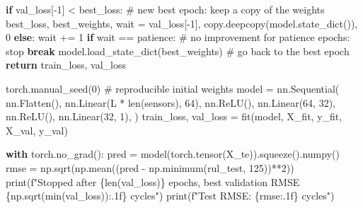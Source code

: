 \documentclass[
  letterpaper,
  DIV=11,
  numbers=noendperiod]{scrreprt}
\newenvironment{Shaded}{\begin{snugshade}}{\end{snugshade}}
\newcommand{\BuiltInTok}[1]{\textcolor[rgb]{0.00,0.23,0.31}{#1}}
\newcommand{\CommentTok}[1]{\textcolor[rgb]{0.37,0.37,0.37}{#1}}
\newcommand{\ControlFlowTok}[1]{\textcolor[rgb]{0.00,0.23,0.31}{\textbf{#1}}}
\newcommand{\DecValTok}[1]{\textcolor[rgb]{0.68,0.00,0.00}{#1}}
\newcommand{\NormalTok}[1]{\textcolor[rgb]{0.00,0.23,0.31}{#1}}
\newcommand{\OperatorTok}[1]{\textcolor[rgb]{0.37,0.37,0.37}{#1}}
\newcommand{\SpecialCharTok}[1]{\textcolor[rgb]{0.37,0.37,0.37}{#1}}
\newcommand{\SpecialStringTok}[1]{\textcolor[rgb]{0.13,0.47,0.30}{#1}}
\begin{document}
\begin{Shaded}
\begin{Highlighting}[]
        \ControlFlowTok{if}\NormalTok{ val\_loss[}\OperatorTok{{-}}\DecValTok{1}\NormalTok{] }\OperatorTok{\textless{}}\NormalTok{ best\_loss:                     }\CommentTok{\# new best epoch: keep a copy of the weights}
\NormalTok{            best\_loss, best\_weights, wait }\OperatorTok{=}\NormalTok{ val\_loss[}\OperatorTok{{-}}\DecValTok{1}\NormalTok{], copy.deepcopy(model.state\_dict()), }\DecValTok{0}
        \ControlFlowTok{else}\NormalTok{:}
\NormalTok{            wait }\OperatorTok{+=} \DecValTok{1}
            \ControlFlowTok{if}\NormalTok{ wait }\OperatorTok{==}\NormalTok{ patience:                         }\CommentTok{\# no improvement for \textasciigrave{}patience\textasciigrave{} epochs: stop}
                \ControlFlowTok{break}
\NormalTok{    model.load\_state\_dict(best\_weights)                  }\CommentTok{\# go back to the best epoch}
    \ControlFlowTok{return}\NormalTok{ train\_loss, val\_loss}

\NormalTok{torch.manual\_seed(}\DecValTok{0}\NormalTok{)                                     }\CommentTok{\# reproducible initial weights}
\NormalTok{model }\OperatorTok{=}\NormalTok{ nn.Sequential(}
\NormalTok{    nn.Flatten(),}
\NormalTok{    nn.Linear(L }\OperatorTok{*} \BuiltInTok{len}\NormalTok{(sensors), }\DecValTok{64}\NormalTok{), nn.ReLU(),}
\NormalTok{    nn.Linear(}\DecValTok{64}\NormalTok{, }\DecValTok{32}\NormalTok{), nn.ReLU(),}
\NormalTok{    nn.Linear(}\DecValTok{32}\NormalTok{, }\DecValTok{1}\NormalTok{),}
\NormalTok{)}
\NormalTok{train\_loss, val\_loss }\OperatorTok{=}\NormalTok{ fit(model, X\_fit, y\_fit, X\_val, y\_val)}

\ControlFlowTok{with}\NormalTok{ torch.no\_grad():}
\NormalTok{    pred }\OperatorTok{=}\NormalTok{ model(torch.tensor(X\_te)).squeeze().numpy()}
\NormalTok{rmse }\OperatorTok{=}\NormalTok{ np.sqrt(np.mean((pred }\OperatorTok{{-}}\NormalTok{ np.minimum(rul\_test, }\DecValTok{125}\NormalTok{))}\OperatorTok{**}\DecValTok{2}\NormalTok{))}
\BuiltInTok{print}\NormalTok{(}\SpecialStringTok{f"Stopped after }\SpecialCharTok{\{}\BuiltInTok{len}\NormalTok{(val\_loss)}\SpecialCharTok{\}}\SpecialStringTok{ epochs, best validation RMSE }\SpecialCharTok{\{}\NormalTok{np}\SpecialCharTok{.}\NormalTok{sqrt(}\BuiltInTok{min}\NormalTok{(val\_loss))}\SpecialCharTok{:.1f\}}\SpecialStringTok{ cycles"}\NormalTok{)}
\BuiltInTok{print}\NormalTok{(}\SpecialStringTok{f"Test RMSE: }\SpecialCharTok{\{}\NormalTok{rmse}\SpecialCharTok{:.1f\}}\SpecialStringTok{ cycles"}\NormalTok{)}
\end{Highlighting}
\end{Shaded}
\end{document}

